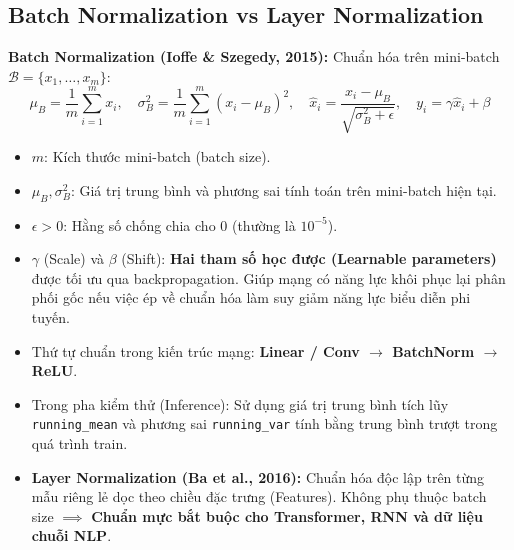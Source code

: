 \documentclass[10pt,a4paper]{article}
\begin{document}
\subsection{Batch Normalization vs Layer Normalization}
\textbf{Batch Normalization (Ioffe \& Szegedy, 2015):} Chuẩn hóa trên mini-batch $\mathcal{B} = \{x_1, \dots, x_m\}$:
\begin{equation}
    \mu_B = \frac{1}{m} \sum_{i=1}^m x_i, \quad \sigma_B^2 = \frac{1}{m} \sum_{i=1}^m (x_i - \mu_B)^2, \quad \hat{x}_i = \frac{x_i - \mu_B}{\sqrt{\sigma_B^2 + \epsilon}}, \quad y_i = \gamma \hat{x}_i + \beta
\end{equation}
\begin{itemize}[leftmargin=*]
    \item $m$: Kích thước mini-batch (batch size).
    \item $\mu_B, \sigma_B^2$: Giá trị trung bình và phương sai tính toán trên mini-batch hiện tại.
    \item $\epsilon > 0$: Hằng số chống chia cho 0 (thường là $10^{-5}$).
    \item $\gamma$ (Scale) và $\beta$ (Shift): \textbf{Hai tham số học được (Learnable parameters)} được tối ưu qua backpropagation. Giúp mạng có năng lực khôi phục lại phân phối gốc nếu việc ép về chuẩn hóa làm suy giảm năng lực biểu diễn phi tuyến.
    \item Thứ tự chuẩn trong kiến trúc mạng: \textbf{Linear / Conv $\to$ BatchNorm $\to$ ReLU}.
    \item Trong pha kiểm thử (Inference): Sử dụng giá trị trung bình tích lũy \texttt{running\_mean} và phương sai \texttt{running\_var} tính bằng trung bình trượt trong quá trình train.
    \item \textbf{Layer Normalization (Ba et al., 2016):} Chuẩn hóa độc lập trên từng mẫu riêng lẻ dọc theo chiều đặc trưng (Features). Không phụ thuộc batch size $\implies$ \textbf{Chuẩn mực bắt buộc cho Transformer, RNN và dữ liệu chuỗi NLP}.
\end{itemize}
\end{document}

